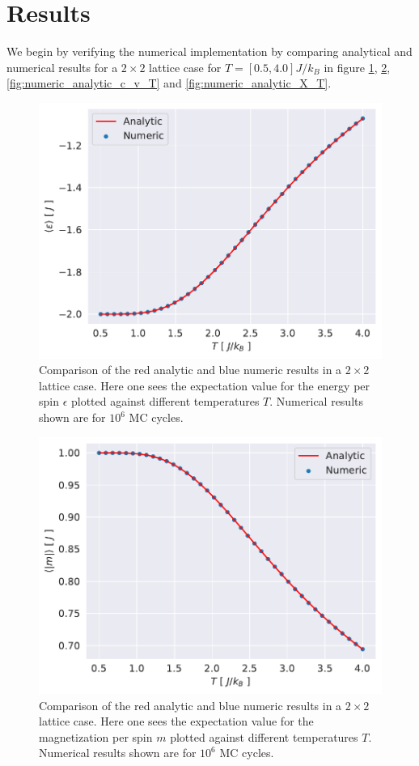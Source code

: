 \documentclass[english,notitlepage,reprint,nofootinbib]{revtex4-1}  %
\begin{document}
\section{Results}\label{sec:results}
We begin by verifying the numerical implementation by comparing  analytical and numerical results for a $2\times2$ lattice case for $T=[0.5,4.0]J/k_B$ in figure \ref{fig:numeric_analytic_e_T}, \ref{fig:numeric_analytic_m_T}, \ref{fig:numeric_analytic_c_v_T} and \ref{fig:numeric_analytic_X_T}.

\begin{figure}[H]
    \centering
    \includegraphics[width=.5\textwidth]{../figures/numeric_analytic_e_T.pdf}
    \caption{Comparison of the red analytic and blue numeric results in a $2\times2$ lattice case. Here one sees the expectation value for the energy per spin $\epsilon$ plotted against different temperatures $T$. Numerical results shown are for $10^6$ MC cycles.}
    \label{fig:numeric_analytic_e_T}
\end{figure}

\begin{figure}[H]
    \centering
    \includegraphics[width=.5\textwidth]{../figures/numeric_analytic_m_T.pdf}
    \caption{Comparison of the red analytic and blue numeric results in a $2\times2$ lattice case. Here one sees the expectation value for the magnetization per spin $m$ plotted against different temperatures $T$. Numerical results shown are for $10^6$ MC cycles.}
    \label{fig:numeric_analytic_m_T}
\end{figure}
\end{document}
